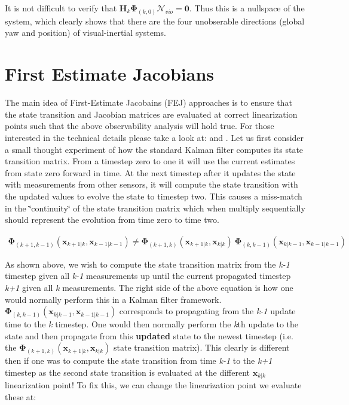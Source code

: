 It is not difficult to verify that $ \mathbf{H}_{k}\mathbf{\Phi}_{(k,0)}\mathcal{N}_{vio} = \mathbf 0 $. Thus this is a nullspace of the system, which clearly shows that there are the four unobserable directions (global yaw and position) of visual-\/inertial systems.\hypertarget{fej_fej-fej}{}\section{First Estimate Jacobians}\label{fej_fej-fej}
The main idea of First-\/\+Estimate Jacobains (F\+EJ) approaches is to ensure that the state transition and Jacobian matrices are evaluated at correct linearization points such that the above observability analysis will hold true. For those interested in the technical details please take a look at\+: \cite{Huang2010IJRR} and \cite{Li2013IJRR}. Let us first consider a small thought experiment of how the standard Kalman filter computes its state transition matrix. From a timestep zero to one it will use the current estimates from state zero forward in time. At the next timestep after it updates the state with measurements from other sensors, it will compute the state transition with the updated values to evolve the state to timestep two. This causes a miss-\/match in the \char`\"{}continuity\char`\"{} of the state transition matrix which when multiply sequentially should represent the evolution from time zero to time two.

\begin{align*} \mathbf{\Phi}_{(k+1,k-1)}(\mathbf{x}_{k+1|k},\mathbf{x}_{k-1|k-1}) \neq \mathbf{\Phi}_{(k+1,k)}(\mathbf{x}_{k+1|k},\mathbf{x}_{k|k}) ~ \mathbf{\Phi}_{(k,k-1)}(\mathbf{x}_{k|k-1},\mathbf{x}_{k-1|k-1}) \end{align*}

As shown above, we wish to compute the state transition matrix from the {\itshape k-\/1} timestep given all {\itshape k-\/1} measurements up until the current propagated timestep {\itshape k+1} given all {\itshape k} measurements. The right side of the above equation is how one would normally perform this in a Kalman filter framework. $\mathbf{\Phi}_{(k,k-1)}(\mathbf{x}_{k|k-1},\mathbf{x}_{k-1|k-1})$ corresponds to propagating from the {\itshape k-\/1} update time to the {\itshape k} timestep. One would then normally perform the {\itshape k}\textquotesingle{}th update to the state and then propagate from this {\bfseries updated} state to the newest timestep (i.\+e. the $ \mathbf{\Phi}_{(k+1,k)}(\mathbf{x}_{k+1|k},\mathbf{x}_{k|k}) $ state transition matrix). This clearly is different then if one was to compute the state transition from time {\itshape k-\/1} to the {\itshape k+1} timestep as the second state transition is evaluated at the different $\mathbf{x}_{k|k}$ linearization point! To fix this, we can change the linearization point we evaluate these at\+:

